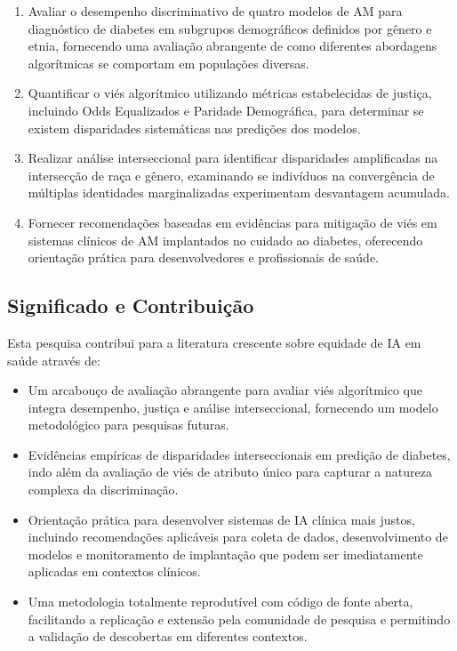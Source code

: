 \begin{enumerate}[leftmargin=*]
    \item Avaliar o desempenho discriminativo de quatro modelos de AM para 
          diagnóstico de diabetes em subgrupos demográficos definidos por 
          gênero e etnia, fornecendo uma avaliação abrangente de como 
          diferentes abordagens algorítmicas se comportam em populações 
          diversas.
    \item Quantificar o viés algorítmico utilizando métricas estabelecidas 
          de justiça, incluindo Odds Equalizados e Paridade Demográfica, 
          para determinar se existem disparidades sistemáticas nas predições 
          dos modelos.
    \item Realizar análise interseccional para identificar disparidades 
          amplificadas na intersecção de raça e gênero, examinando se 
          indivíduos na convergência de múltiplas identidades marginalizadas 
          experimentam desvantagem acumulada.
    \item Fornecer recomendações baseadas em evidências para mitigação de 
          viés em sistemas clínicos de AM implantados no cuidado ao diabetes, 
          oferecendo orientação prática para desenvolvedores e profissionais 
          de saúde.
\end{enumerate}

\subsection{Significado e Contribuição}

Esta pesquisa contribui para a literatura crescente sobre equidade de IA 
em saúde através de:

\begin{itemize}[leftmargin=*]
    \item Um arcabouço de avaliação abrangente para avaliar viés algorítmico 
          que integra desempenho, justiça e análise interseccional, 
          fornecendo um modelo metodológico para pesquisas futuras.
    \item Evidências empíricas de disparidades interseccionais em predição 
          de diabetes, indo além da avaliação de viés de atributo único para 
          capturar a natureza complexa da discriminação.
    \item Orientação prática para desenvolver sistemas de IA clínica mais 
          justos, incluindo recomendações aplicáveis para coleta de dados, 
          desenvolvimento de modelos e monitoramento de implantação que 
          podem ser imediatamente aplicadas em contextos clínicos.
    \item Uma metodologia totalmente reprodutível com código de fonte 
          aberta, facilitando a replicação e extensão pela comunidade de 
          pesquisa e permitindo a validação de descobertas em diferentes 
          contextos.
\end{itemize}

